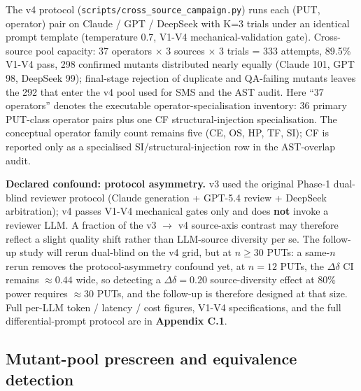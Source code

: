 \documentclass[manuscript,screen,review]{acmart}
\begin{document}
The v4 protocol (\texttt{scripts/cross\_source\_campaign.py}) runs each
(PUT, operator) pair on Claude / GPT / DeepSeek with K=3 trials under an
identical prompt template (temperature 0.7, V1-V4 mechanical-validation
gate). Cross-source pool capacity: 37 operators $\times$ 3 sources $\times$ 3 trials =
333 attempts, 89.5\% V1-V4 pass, 298 confirmed mutants distributed nearly
equally (Claude 101, GPT 98, DeepSeek 99); final-stage rejection of
duplicate and QA-failing mutants leaves the 292 that enter the v4 pool
used for SMS and the AST audit.
Here ``37 operators'' denotes the executable operator-specialisation
inventory: 36 primary PUT-class operator pairs plus one CF
structural-injection specialisation. The conceptual operator family
count remains five (CE, OS, HP, TF, SI); CF is reported only as a
specialised SI/structural-injection row in the AST-overlap audit.

\textbf{Declared confound: protocol asymmetry.} v3 used the
original Phase-1 dual-blind reviewer protocol (Claude generation +
GPT-5.4 review + DeepSeek arbitration); v4 passes V1-V4 mechanical gates
only and does \textbf{not} invoke a reviewer LLM. A fraction of the v3 $\to$
v4 source-axis contrast may therefore reflect a slight quality shift
rather than LLM-source diversity per se. The follow-up study will rerun
dual-blind on the v4 grid, but at $n \geq 30$ PUTs: a same-$n$ rerun
removes the protocol-asymmetry confound yet, at $n = 12$ PUTs, the
$\Delta\delta$ CI remains $\approx 0.44$ wide, so detecting a
$\Delta\delta = 0.20$ source-diversity effect at 80\% power requires
$\approx 30$ PUTs, and the follow-up is therefore designed at that size.
Full per-LLM token / latency / cost figures,
V1-V4 specifications, and the full differential-prompt protocol are in
\textbf{Appendix C.1}.

\subsection{Mutant-pool prescreen and equivalence detection}\label{mutant-pool-prescreen-and-equivalence-detection}
\end{document}
